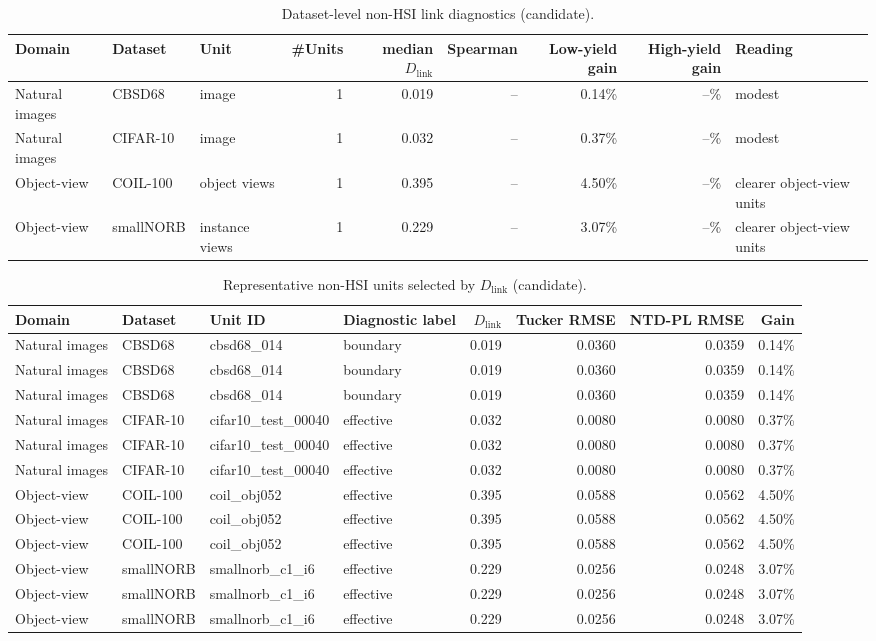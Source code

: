 
\begin{table}[t]
\centering
\caption{Dataset-level non-HSI link diagnostics (candidate).}
\begin{tabular}{@{}l l l r r r r r l@{}}
\toprule
Domain & Dataset & Unit & \#Units & median $D_{\mathrm{link}}$ & Spearman & Low-yield gain & High-yield gain & Reading \\
\midrule
Natural images & CBSD68 & image & 1 & 0.019 & -- & 0.14\% & --\% & modest \\
Natural images & CIFAR-10 & image & 1 & 0.032 & -- & 0.37\% & --\% & modest \\
Object-view & COIL-100 & object views & 1 & 0.395 & -- & 4.50\% & --\% & clearer object-view units \\
Object-view & smallNORB & instance views & 1 & 0.229 & -- & 3.07\% & --\% & clearer object-view units \\
\bottomrule
\end{tabular}
\end{table}

\begin{table}[t]
\centering
\caption{Representative non-HSI units selected by $D_{\mathrm{link}}$ (candidate).}
\begin{tabular}{@{}l l l l r r r r@{}}
\toprule
Domain & Dataset & Unit ID & Diagnostic label & $D_{\mathrm{link}}$ & Tucker RMSE & NTD-PL RMSE & Gain \\
\midrule
Natural images & CBSD68 & cbsd68_014 & boundary & 0.019 & 0.0360 & 0.0359 & 0.14\% \\
Natural images & CBSD68 & cbsd68_014 & boundary & 0.019 & 0.0360 & 0.0359 & 0.14\% \\
Natural images & CBSD68 & cbsd68_014 & boundary & 0.019 & 0.0360 & 0.0359 & 0.14\% \\
Natural images & CIFAR-10 & cifar10_test_00040 & effective & 0.032 & 0.0080 & 0.0080 & 0.37\% \\
Natural images & CIFAR-10 & cifar10_test_00040 & effective & 0.032 & 0.0080 & 0.0080 & 0.37\% \\
Natural images & CIFAR-10 & cifar10_test_00040 & effective & 0.032 & 0.0080 & 0.0080 & 0.37\% \\
Object-view & COIL-100 & coil_obj052 & effective & 0.395 & 0.0588 & 0.0562 & 4.50\% \\
Object-view & COIL-100 & coil_obj052 & effective & 0.395 & 0.0588 & 0.0562 & 4.50\% \\
Object-view & COIL-100 & coil_obj052 & effective & 0.395 & 0.0588 & 0.0562 & 4.50\% \\
Object-view & smallNORB & smallnorb_c1_i6 & effective & 0.229 & 0.0256 & 0.0248 & 3.07\% \\
Object-view & smallNORB & smallnorb_c1_i6 & effective & 0.229 & 0.0256 & 0.0248 & 3.07\% \\
Object-view & smallNORB & smallnorb_c1_i6 & effective & 0.229 & 0.0256 & 0.0248 & 3.07\% \\
\bottomrule
\end{tabular}
\end{table}
